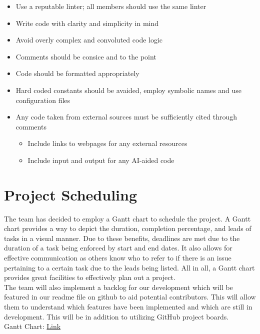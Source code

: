 \documentclass{article}
\begin{document}
\begin{itemize}
\begin{itemize}
  \end{itemize}

\item Use a reputable linter; all members should use the same linter
\item Write code with clarity and simplicity in mind
\item Avoid overly complex and convoluted code logic
\item Comments should be consice and to the point
\item Code should be formatted appropriately
\item Hard coded constants should be avaided, employ symbolic names and use configuration files 
\item Any code taken from external sources must be sufficiently cited through comments
\begin{itemize}
  \item Include links to webpages for any external resources
  \item Include input and output for any AI-aided code
\end{itemize}


\end{itemize}


\newpage

\section{Project Scheduling}

The team has decided to employ a Gantt chart to schedule the project. A Gantt chart provides a way to depict the duration, completion percentage, and leads of tasks in a visual manner. Due to these benefits, deadlines are met due to the duration of a task being enforced by start and end dates. It also allows for effective communication as others know who to refer to if there is an issue pertaining to a certain task due to the leads being listed. All in all, a Gantt chart provides great facilities to effectively plan out a project. \\

The team will also implement a backlog for our development which will be featured in our readme file on github to aid potential contributors. This will allow them to understand which features have been implemented and which are still in development. This will be in addition to utilizing GitHub project boards.\\

Gantt Chart: \href{https://mcmasteru365-my.sharepoint.com/:x:/g/personal/bhatth14_mcmaster_ca/ESjvjVJfZflPvcV8xfFiPxEBNGdj_fdNWy0EyGGiqIbAEw?e=9wUfQj}{Link}
\end{document}

